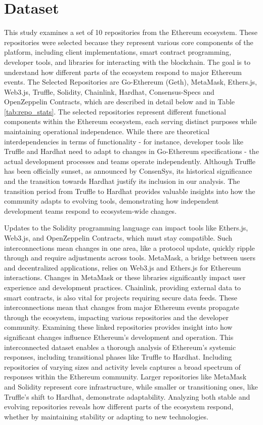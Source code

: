 \section{Dataset}
\label{dataset}

This study examines a set of 10 repositories from the Ethereum ecosystem. These repositories were selected because they represent various core components of the platform, including client implementations, smart contract programming, developer tools, and libraries for interacting with the blockchain. The goal is to understand how different parts of the ecosystem respond to major Ethereum events.
The Selected Repositories are Go-Ethereum (Geth), MetaMask, Ethers.js, Web3.js, Truffle, Solidity, Chainlink, Hardhat, Consensus-Specs and OpenZeppelin Contracts, which are described in detail below and in Table \ref{tab:repo_stats}.
The selected repositories represent different functional components within the Ethereum ecosystem, each serving distinct purposes while maintaining operational independence. While there are theoretical interdependencies in terms of functionality - for instance, developer tools like Truffle and Hardhat need to adapt to changes in Go-Ethereum specifications - the actual development processes and teams operate independently. Although Truffle has been officially sunset, as announced by ConsenSys, its historical significance and the transition towards Hardhat justify its inclusion in our analysis. The transition period from Truffle to Hardhat provides valuable insights into how the community adapts to evolving tools, demonstrating how independent development teams respond to ecosystem-wide changes.

Updates to the Solidity programming language can impact tools like Ethers.js, Web3.js, and OpenZeppelin Contracts, which must stay compatible. Such interconnections mean changes in one area, like a protocol update, quickly ripple through and require adjustments across tools. 
MetaMask, a bridge between users and decentralized applications, relies on Web3.js and Ethers.js for Ethereum interactions. Changes in MetaMask or these libraries significantly impact user experience and development practices. Chainlink, providing external data to smart contracts, is also vital for projects requiring secure data feeds.
These interconnections mean that changes from major Ethereum events propagate through the ecosystem, impacting various repositories and the developer community. Examining these linked repositories provides insight into how significant changes influence Ethereum’s development and operation. This interconnected dataset enables a thorough analysis of Ethereum’s systemic responses, including transitional phases like Truffle to Hardhat.
Including repositories of varying sizes and activity levels captures a broad spectrum of responses within the Ethereum community. Larger repositories like MetaMask and Solidity represent core infrastructure, while smaller or transitioning ones, like Truffle’s shift to Hardhat, demonstrate adaptability. Analyzing both stable and evolving repositories reveals how different parts of the ecosystem respond, whether by maintaining stability or adapting to new technologies.


